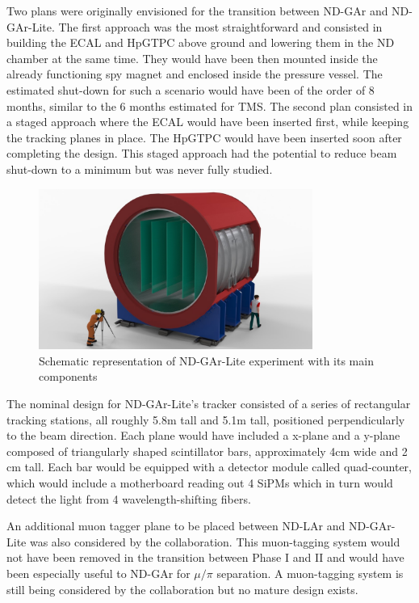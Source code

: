 Two plans were originally envisioned for the transition between ND-GAr and ND-GAr-Lite. The first approach was the most straightforward and consisted in building the ECAL and HpGTPC above ground and lowering them in the ND chamber at the same time. They would have been then mounted inside the already functioning spy magnet and enclosed inside the pressure vessel. The estimated shut-down for such a scenario would have been of the order of 8 months, similar to the 6 months estimated for TMS. The second plan consisted in a staged approach where the ECAL would have been inserted first, while keeping the tracking planes in place. The HpGTPC would have been inserted soon after completing the design. This staged approach had the potential to reduce beam shut-down to a minimum but was never fully studied.

\begin{figure}[t]
     \centering
     \includegraphics[width=0.8\textwidth]{figures/ch3-DUNE/MPD_Magnet_w_Tracker_Planes.jpg}
     \caption{Schematic representation of ND-GAr-Lite experiment with its main components}
        \label{fig:Lite}
\end{figure}

The nominal design for ND-GAr-Lite’s tracker consisted of a series of rectangular tracking stations, all roughly 5.8m tall and 5.1m tall, positioned perpendicularly to the beam direction.
Each plane would have included a x-plane and a y-plane composed of triangularly shaped scintillator bars, approximately 4cm wide and 2 cm tall. Each bar would be equipped with a detector module
called quad-counter, which would include a motherboard reading out 4 SiPMs which in turn would detect the light from 4 wavelength-shifting fibers. 

An additional muon tagger plane to be placed between ND-LAr and ND-GAr-Lite was also considered by the collaboration. This muon-tagging system would not have been removed in the transition between Phase I and II and would have been especially useful to ND-GAr for $\mu/\pi$ separation. A muon-tagging system is still being considered by the collaboration but no mature design exists.  


